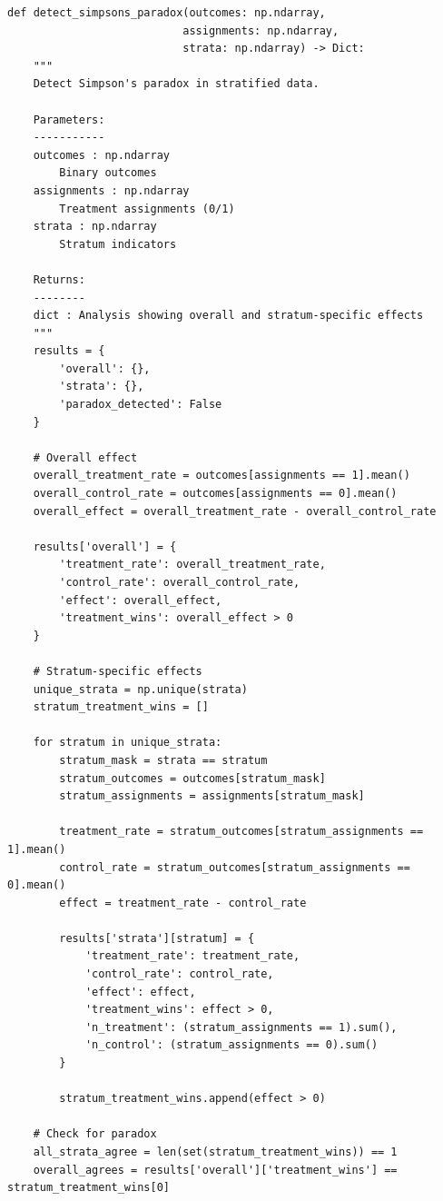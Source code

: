 \lstset{language=Python, caption=Detecting Simpson's Paradox, label=lst:simpsons_paradox}
\begin{lstlisting}
def detect_simpsons_paradox(outcomes: np.ndarray,
                           assignments: np.ndarray,
                           strata: np.ndarray) -> Dict:
    """
    Detect Simpson's paradox in stratified data.

    Parameters:
    -----------
    outcomes : np.ndarray
        Binary outcomes
    assignments : np.ndarray
        Treatment assignments (0/1)
    strata : np.ndarray
        Stratum indicators

    Returns:
    --------
    dict : Analysis showing overall and stratum-specific effects
    """
    results = {
        'overall': {},
        'strata': {},
        'paradox_detected': False
    }

    # Overall effect
    overall_treatment_rate = outcomes[assignments == 1].mean()
    overall_control_rate = outcomes[assignments == 0].mean()
    overall_effect = overall_treatment_rate - overall_control_rate

    results['overall'] = {
        'treatment_rate': overall_treatment_rate,
        'control_rate': overall_control_rate,
        'effect': overall_effect,
        'treatment_wins': overall_effect > 0
    }

    # Stratum-specific effects
    unique_strata = np.unique(strata)
    stratum_treatment_wins = []

    for stratum in unique_strata:
        stratum_mask = strata == stratum
        stratum_outcomes = outcomes[stratum_mask]
        stratum_assignments = assignments[stratum_mask]

        treatment_rate = stratum_outcomes[stratum_assignments == 1].mean()
        control_rate = stratum_outcomes[stratum_assignments == 0].mean()
        effect = treatment_rate - control_rate

        results['strata'][stratum] = {
            'treatment_rate': treatment_rate,
            'control_rate': control_rate,
            'effect': effect,
            'treatment_wins': effect > 0,
            'n_treatment': (stratum_assignments == 1).sum(),
            'n_control': (stratum_assignments == 0).sum()
        }

        stratum_treatment_wins.append(effect > 0)

    # Check for paradox
    all_strata_agree = len(set(stratum_treatment_wins)) == 1
    overall_agrees = results['overall']['treatment_wins'] == stratum_treatment_wins[0]


\end{lstlisting}
